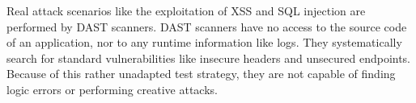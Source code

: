 Real attack scenarios like the exploitation of XSS and SQL injection are performed by \ac{DAST} scanners. \ac{DAST} scanners have no access to the source code of an application, nor to any runtime information like logs. \cite{Singh_2024} They systematically search for standard vulnerabilities like insecure headers and unsecured endpoints. Because of this rather unadapted test strategy, they are not capable of finding logic errors or performing creative attacks.

%
%




